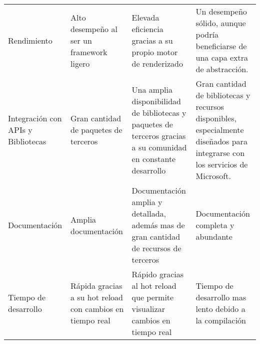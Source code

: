 \begin{longtable}{|p{5cm}|p{3cm}|p{3cm}|p{3cm}|}
    Rendimiento                                    & Alto desempeño al ser un framework ligero                 & Elevada eficiencia gracias a su propio motor de renderizado                                                    & Un desempeño sólido, aunque podría beneficiarse de una capa extra de abstracción.                                            \\
    Integración con APIs y Bibliotecas             & Gran cantidad de paquetes de terceros                     & Una amplia disponibilidad de bibliotecas y paquetes de terceros gracias a su comunidad en constante desarrollo & Gran cantidad de bibliotecas y recursos disponibles, especialmente diseñados para integrarse con los servicios de Microsoft. \\
    Documentación                                  & Amplia documentación                                      & Documentación amplia y detallada, además  mas de gran cantidad de recursos de terceros                         & Documentación completa y abundante                                                                                           \\
    Tiempo de desarrollo                           & Rápida gracias a su hot reload con cambios en tiempo real & Rápido gracias al hot reload que permite visualizar cambios en tiempo real                                     & Tiempo de desarrollo mas lento debido a la compilación                                                                       \\
\end{longtable}